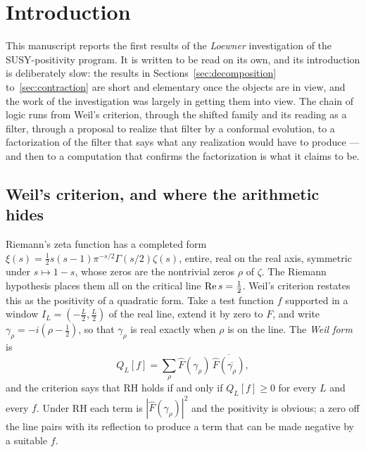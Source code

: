 \section{Introduction}\label{sec:intro}

This manuscript reports the first results of the \emph{Loewner} investigation
of the SUSY-positivity program. It is written to be read on its own, and its
introduction is deliberately slow: the results in Sections~\ref{sec:decomposition}
to~\ref{sec:contraction} are short and elementary once the objects are in
view, and the work of the investigation was largely in getting them into view.
The chain of logic runs from Weil's criterion, through the shifted family and
its reading as a filter, through a proposal to realize that filter by a
conformal evolution, to a factorization of the filter that says what any
realization would have to produce --- and then to a computation that confirms
the factorization is what it claims to be.

\subsection{Weil's criterion, and where the arithmetic hides}

Riemann's zeta function has a completed form
$\xi(s)=\frac12s(s-1)\pi^{-s/2}\Gamma(s/2)\zeta(s)$, entire, real on the real
axis, symmetric under $s\mapsto1-s$, whose zeros are the nontrivial zeros
$\rho$ of $\zeta$. The Riemann hypothesis places them all on the critical line
$\operatorname{Re} s=\frac12$. Weil's criterion restates this as the positivity of a
quadratic form. Take a test function $f$ supported in a window
$I_L=(-\frac L2,\frac L2)$ of the real line, extend it by zero to $F$, and
write $\gamma_\rho=-i(\rho-\frac12)$, so that $\gamma_\rho$ is real exactly when
$\rho$ is on the line. The \emph{Weil form} is
\begin{equation}\label{eq:intro-spectral}
 Q_L[f]=\sum_\rho\widehat F(\gamma_\rho)\,\overline{\widehat F(\overline{\gamma_\rho})},
\end{equation}
and the criterion says that RH holds if and only if $Q_L[f]\geq0$ for every
$L$ and every $f$. Under RH each term is $|\widehat F(\gamma_\rho)|^2$ and the
positivity is obvious; a zero off the line pairs with its reflection to produce
a term that can be made negative by a suitable $f$.

